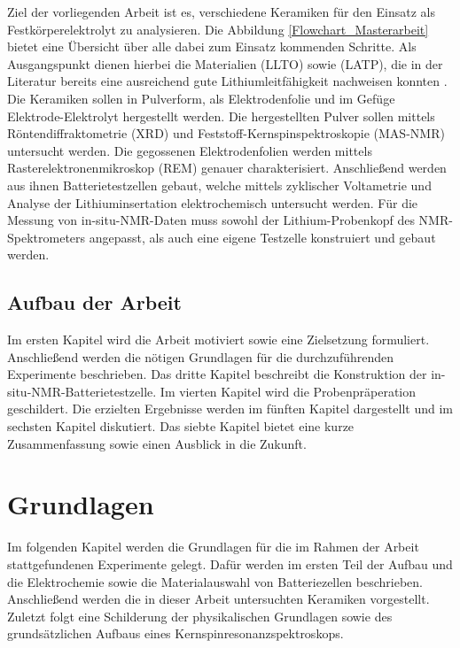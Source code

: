 \documentclass[a4paper, 11pt, headsepline,footsepline,twoside,abstract]{scrbook}
\begin{document}
Ziel der vorliegenden Arbeit ist es, verschiedene Keramiken für den Einsatz als Festkörperelektrolyt zu analysieren. Die Abbildung \ref{Flowchart_Masterarbeit} bietet eine Übersicht über alle dabei zum Einsatz kommenden Schritte. Als Ausgangspunkt dienen hierbei die Materialien  (LLTO) sowie  (LATP), die in der Literatur bereits eine ausreichend gute Lithiumleitfähigkeit nachweisen konnten \cite{tatsumisago2013recent}. Die Keramiken sollen in Pulverform, als Elektrodenfolie und im Gefüge Elektrode-Elektrolyt hergestellt werden. Die hergestellten Pulver sollen mittels Röntendiffraktometrie (XRD) und Feststoff-Kernspinspektroskopie (MAS-NMR) untersucht werden. Die gegossenen Elektrodenfolien werden mittels Rasterelektronenmikroskop (REM) genauer charakterisiert. Anschließend werden aus ihnen Batterietestzellen gebaut, welche mittels zyklischer Voltametrie und Analyse der Lithiuminsertation elektrochemisch untersucht werden. Für die Messung von in-situ-NMR-Daten muss sowohl der Lithium-Probenkopf des NMR-Spektrometers angepasst, als auch eine eigene Testzelle konstruiert und gebaut werden.
\section{Aufbau der Arbeit}
Im ersten Kapitel wird die Arbeit motiviert sowie eine Zielsetzung formuliert. Anschließend werden die nötigen Grundlagen für die durchzuführenden Experimente beschrieben. Das dritte Kapitel beschreibt die Konstruktion der in-situ-NMR-Batterietestzelle. Im vierten Kapitel wird die Probenpräperation geschildert. Die erzielten Ergebnisse werden im fünften Kapitel dargestellt und im sechsten Kapitel diskutiert. Das siebte Kapitel bietet eine kurze Zusammenfassung sowie einen Ausblick in die Zukunft.


\chapter{Grundlagen}
Im folgenden Kapitel werden die Grundlagen für die im Rahmen der Arbeit stattgefundenen Experimente gelegt. Dafür werden im ersten Teil der Aufbau und die Elektrochemie sowie die Materialauswahl von Batteriezellen beschrieben. Anschließend werden die in dieser Arbeit untersuchten Keramiken vorgestellt. Zuletzt folgt eine Schilderung der physikalischen Grundlagen sowie des grundsätzlichen Aufbaus eines Kernspinresonanzspektroskops.
\end{document}
